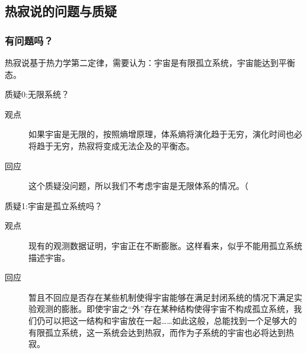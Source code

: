 \documentclass{if-beamer}
\begin{document}
\subsection{热寂说的问题与质疑}
\begin{frame}
    \frametitle{有问题吗？}
        热寂说基于热力学第二定律，需要认为：宇宙是有限孤立系统，宇宙能达到平衡态。
        \begin{alertblock}{质疑0:无限系统？}
            \begin{description}
                \item[观点]如果宇宙是无限的，按照熵增原理，体系熵将演化趋于无穷，演化时间也必将趋于无穷，热寂将变成无法企及的平衡态。
                \item[回应]这个质疑没问题，所以我们不考虑宇宙是无限体系的情况。（
            \end{description}
        \end{alertblock}
        \begin{block}{质疑1:宇宙是孤立系统吗？}
            \begin{description}
                \item[观点]现有的观测数据证明，宇宙正在不断膨胀。这样看来，似乎不能用孤立系统描述宇宙。
                \item[回应]暂且不回应是否存在某些机制使得宇宙能够在满足封闭系统的情况下满足实验观测的膨胀。即使宇宙之“外”存在某种结构使得宇宙不构成孤立系统，我们仍可以把这一结构和宇宙放在一起……如此这般，总能找到一个足够大的有限孤立系统，这一系统会达到热寂，而作为子系统的宇宙也必将达到热寂。
            \end{description}
        \end{block}


\end{frame}
\end{document}
